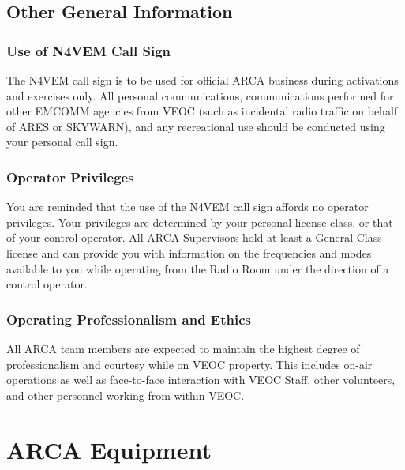 \documentclass[pdflatex,letterpaper,twoside,12pt]{book}
\begin{document}
\section{Other General Information}

\subsection{Use of N4VEM Call Sign}

The N4VEM call sign is to be used for official ARCA business during activations and exercises only.  All personal communications, communications performed for other EMCOMM agencies from VEOC (such as incidental radio traffic on behalf of ARES or SKYWARN), and any recreational use should be conducted using your personal call sign.

\subsection{Operator Privileges}

You are reminded that the use of the N4VEM call sign affords no operator privileges.  Your privileges are determined by your personal license class, or that of your control operator.  All ARCA Supervisors hold at least a General Class license and can provide you with information on the frequencies and modes available to you while operating from the Radio Room under the direction of a control operator.

\subsection{Operating Professionalism and Ethics}

All ARCA team members are expected to maintain the highest degree of professionalism and courtesy while on VEOC property.  This includes on-air operations as well as face-to-face interaction with VEOC Staff, other volunteers, and other personnel working from within VEOC.


\chapter{ARCA Equipment}
\end{document}
